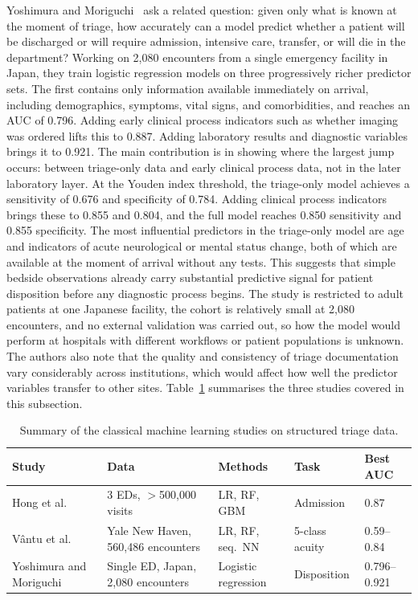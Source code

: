 \documentclass[11pt]{article}
\begin{document}
Yoshimura and Moriguchi~\cite{Yoshimura2026} ask a related question: given only what is known at the moment of triage, how accurately can a model predict whether a patient will be discharged or will require admission, intensive care, transfer, or will die in the department? Working on 2,080 encounters from a single emergency facility in Japan, they train logistic regression models on three progressively richer predictor sets. The first contains only information available immediately on arrival, including demographics, symptoms, vital signs, and comorbidities, and reaches an AUC of 0.796. Adding early clinical process indicators such as whether imaging was ordered lifts this to 0.887. Adding laboratory results and diagnostic variables brings it to 0.921. The main contribution is in showing where the largest jump occurs: between triage-only data and early clinical process data, not in the later laboratory layer. At the Youden index threshold, the triage-only model achieves a sensitivity of 0.676 and specificity of 0.784. Adding clinical process indicators brings these to 0.855 and 0.804, and the full model reaches 0.850 sensitivity and 0.855 specificity. The most influential predictors in the triage-only model are age and indicators of acute neurological or mental status change, both of which are available at the moment of arrival without any tests. This suggests that simple bedside observations already carry substantial predictive signal for patient disposition before any diagnostic process begins. The study is restricted to adult patients at one Japanese facility, the cohort is relatively small at 2,080 encounters, and no external validation was carried out, so how the model would perform at hospitals with different workflows or patient populations is unknown. The authors also note that the quality and consistency of triage documentation vary considerably across institutions, which would affect how well the predictor variables transfer to other sites. Table~\ref{tab:classical_ml} summarises the three studies covered in this subsection.

\begin{table}[H]
\centering
\caption{Summary of the classical machine learning studies on structured triage data.}
\label{tab:classical_ml}
\begin{tabular}{p{3.5cm} p{3cm} p{2.5cm} p{2cm} l}
\toprule
\textbf{Study} & \textbf{Data} & \textbf{Methods} & \textbf{Task} & \textbf{Best AUC} \\
\midrule
Hong et al.~\cite{Hong2018PredictingHA} & 3 EDs, $>$500{,}000 visits & LR, RF, GBM & Admission & 0.87 \\
Vântu et al.~\cite{Vantu2023} & Yale New Haven, 560{,}486 encounters & LR, RF, seq.\ NN & 5-class acuity & 0.59--0.84 \\
Yoshimura and Moriguchi~\cite{Yoshimura2026} & Single ED, Japan, 2{,}080 encounters & Logistic regression & Disposition & 0.796--0.921 \\
\bottomrule
\end{tabular}
\end{table}
\end{document}
